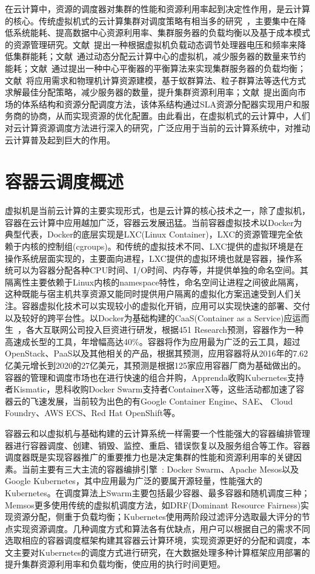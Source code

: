在云计算中，资源的调度器对集群的性能和资源利用率起到决定性作用，是云计算的核心。传统虚拟机式的云计算集群对调度策略有相当多的研究~\cite{CloudSummarize}，主要集中在降低系统能耗、提高数据中心资源利用率、集群服务器的负载均衡以及基于成本模式的资源管理研究。文献~提出一种根据虚拟机负载动态调节处理器电压和频率来降低集群能耗；文献~通过动态分配云计算中心的虚拟机，减少服务器的数量来节约能耗；文献~通过提出一种中心平衡器的平衡算法来实现集群服务器的负载均衡；文献~将应用需求和物理机计算资源建模，基于蚁群算法、粒子群算法等迭代方式求解最佳分配策略，减少服务器的数量，提升集群资源利用率；文献~提出面向市场的体系结构和资源分配调度方法，该体系结构通过SLA资源分配器实现用户和服务商的协商，从而实现资源的优化配置。由此看出，在虚拟机式的云计算中，人们对云计算资源调度方法进行深入的研究，广泛应用于当前的云计算系统中，对推动云计算普及起到巨大的作用。

\section{容器云调度概述}
虚拟机是当前云计算的主要实现形式，也是云计算的核心技术之一，除了虚拟机，容器在云计算中应用越加广泛，容器云发展迅猛。当前容器虚拟技术以Docker为典型代表，Docker的底层实现是LXC(Linux Container)，LXC的资源管理完全依赖于内核的控制组(cgroups)。和传统的虚拟技术不同、LXC提供的虚拟环境是在操作系统层面实现的，主要面向进程，LXC提供的虚拟环境也就是容器，操作系统可以为容器分配各种CPU时间、I/O时间、内存等，并提供单独的命名空间。其隔离性主要依赖于Linux内核的namespace特性，命名空间让进程之间彼此隔离，这种既能与宿主机共享资源又能同时提供用户隔离的虚拟化方案迅速受到人们关注。容器虚拟化技术可以实现较小的虚拟化开销，应用可以实现快速的部署、交付以及较好的跨平台性。以Docker为基础构建的CaaS(Container as a Service)应运而生~\cite{Kozhirbayev2017A}，各大互联网公司投入巨资进行研发，根据451 Research预测，容器作为一种高速成长型的工具，年增幅高达40\%。容器将作为应用最为广泛的云工具，超过OpenStack、PaaS以及其他相关的产品，根据其预测，应用容器将从2016年的7.62亿美元增长到2020的27亿美元，其预测是根据125家应用容器厂商为基础做出的。容器的管理和调度市场也在进行快速的组合并购，Apprenda收购Kubernetes支持者Kismatic，思科收购Docker Swarm支持者ContainerX等，这些活动都加速了容器云的飞速发展，当前较为出色的有Google Container Engine、SAE、 Cloud Foundry、AWS ECS、Red Hat OpenShift等。

容器云和以虚拟机与基础构建的云计算系统一样需要一个性能强大的容器编排管理器进行容器调度、创建、销毁、监控、重启、错误恢复以及服务组合等工作。容器调度器既是实现容器推广的重要推力也是决定集群的性能和资源利用率的关键因素。当前主要有三大主流的容器编排引擎~\cite{Usman2016}: Docker Swarm、Apache Mesos以及Google Kubernetes，其中应用最为广泛的要属开源轻量，性能强大的Kubernetes。在调度算法上Swarm主要包括最少容器、最多容器和随机调度三种；Memsos更多使用传统的虚拟机调度方法，如DRF(Dominant Resource Fairness)实现资源分配，侧重于负载均衡；Kubernetes使用两阶段过滤评分选取最大评分的节点实现资源调度。几种调度方式和算法各有优缺点，用户可以根据自己的需求不同选取相应的容器调度框架构建其容器云计算环境，实现资源更好的分配和调度，本文主要对Kubernetes的调度方式进行研究，在大数据处理多种计算框架应用部署的提升集群资源利用率和负载均衡，使应用的执行时间更短。

